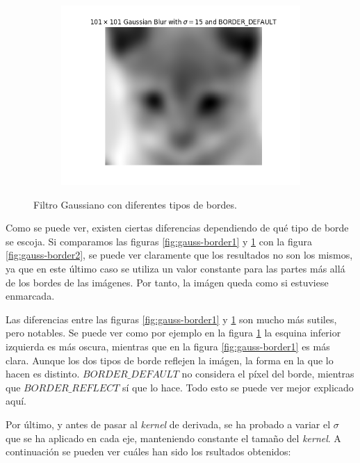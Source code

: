 \documentclass[11pt,a4paper]{article}
\begin{document}
\begin{figure}[H]\ContinuedFloat
\begin{subfigure}{\textwidth}
	\centering
	\includegraphics[scale=0.5]{img/gauss-border3.png}
	\label{fig:gauss-border3}
\end{subfigure}
\caption{Filtro Gaussiano con diferentes tipos de bordes.}
\label{fig:gauss-borders}
\end{figure}

Como se puede ver, existen ciertas diferencias dependiendo de qué tipo de borde se escoja. Si comparamos las figuras
\ref{fig:gauss-border1} y \ref{fig:gauss-border3} con la figura \ref{fig:gauss-border2}, se puede ver claramente que
los resultados no son los mismos, ya que en este último caso se utiliza un valor constante para las partes más allá
de los bordes de las imágenes. Por tanto, la imágen queda como si estuviese enmarcada.

Las diferencias entre las figuras \ref{fig:gauss-border1} y \ref{fig:gauss-border3} son mucho más sutiles, pero notables.
Se puede ver como por ejemplo en la figura \ref{fig:gauss-border3} la esquina inferior izquierda es más oscura, mientras
que en la figura \ref{fig:gauss-border1} es más clara. Aunque los dos tipos de borde reflejen la imágen, la forma en la
que lo hacen es distinto. $BORDER\_DEFAULT$ no considera el píxel del borde, mientras que $BORDER\_REFLECT$ sí que lo hace.
Todo esto se puede ver mejor explicado aquí. %

Por último, y antes de pasar al \textit{kernel} de derivada, se ha probado a variar el $\sigma$ que se ha aplicado en cada
eje, manteniendo constante el tamaño del \textit{kernel}. A continuación se pueden ver cuáles han sido los rsultados obtenidos:
\end{document}

